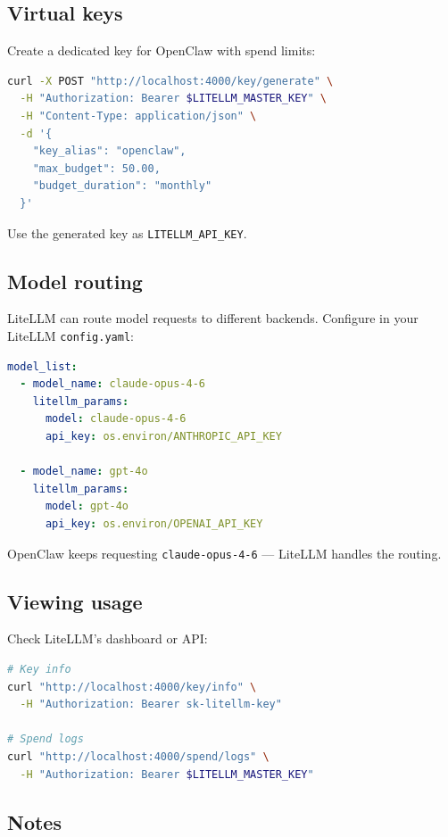 \subsection{Virtual keys}


Create a dedicated key for OpenClaw with spend limits:

\begin{lstlisting}[language=bash]
curl -X POST "http://localhost:4000/key/generate" \
  -H "Authorization: Bearer $LITELLM_MASTER_KEY" \
  -H "Content-Type: application/json" \
  -d '{
    "key_alias": "openclaw",
    "max_budget": 50.00,
    "budget_duration": "monthly"
  }'
\end{lstlisting}


Use the generated key as \texttt{LITELLM\_API\_KEY}.

\subsection{Model routing}


LiteLLM can route model requests to different backends. Configure in your LiteLLM \texttt{config.yaml}:

\begin{lstlisting}[language=yaml]
model_list:
  - model_name: claude-opus-4-6
    litellm_params:
      model: claude-opus-4-6
      api_key: os.environ/ANTHROPIC_API_KEY

  - model_name: gpt-4o
    litellm_params:
      model: gpt-4o
      api_key: os.environ/OPENAI_API_KEY
\end{lstlisting}


OpenClaw keeps requesting \texttt{claude-opus-4-6} — LiteLLM handles the routing.

\subsection{Viewing usage}


Check LiteLLM's dashboard or API:

\begin{lstlisting}[language=bash]
# Key info
curl "http://localhost:4000/key/info" \
  -H "Authorization: Bearer sk-litellm-key"

# Spend logs
curl "http://localhost:4000/spend/logs" \
  -H "Authorization: Bearer $LITELLM_MASTER_KEY"
\end{lstlisting}


\subsection{Notes}


